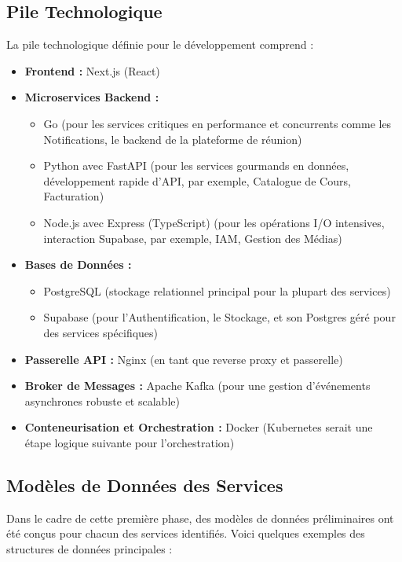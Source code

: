 \subsection{Pile Technologique}
La pile technologique définie pour le développement comprend :
\begin{itemize}
  \item \textbf{Frontend :} Next.js (React)
  \item \textbf{Microservices Backend :}
    \begin{itemize}
      \item Go (pour les services critiques en performance et concurrents comme les Notifications, le backend de la plateforme de réunion)
      \item Python avec FastAPI (pour les services gourmands en données, développement rapide d'API, par exemple, Catalogue de Cours, Facturation)
      \item Node.js avec Express (TypeScript) (pour les opérations I/O intensives, interaction Supabase, par exemple, IAM, Gestion des Médias)
    \end{itemize}
  \item \textbf{Bases de Données :}
    \begin{itemize}
      \item PostgreSQL (stockage relationnel principal pour la plupart des services)
      \item Supabase (pour l'Authentification, le Stockage, et son Postgres géré pour des services spécifiques)
    \end{itemize}
  \item \textbf{Passerelle API :} Nginx (en tant que reverse proxy et passerelle)
  \item \textbf{Broker de Messages :} Apache Kafka (pour une gestion d'événements asynchrones robuste et scalable)
  \item \textbf{Conteneurisation et Orchestration :} Docker (Kubernetes serait une étape logique suivante pour l'orchestration)
\end{itemize}

\subsection{Modèles de Données des Services}
Dans le cadre de cette première phase, des modèles de données préliminaires ont été conçus pour chacun des services identifiés. Voici quelques exemples des structures de données principales :

